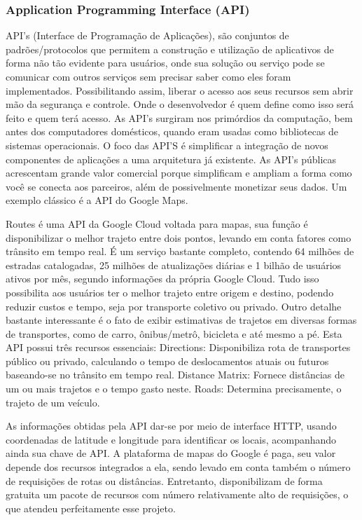 \subsubsection{Application Programming Interface (API)}
API’s (Interface de Programação de Aplicações), são conjuntos de padrões/protocolos que permitem a construção e utilização de aplicativos de forma não tão evidente para usuários, onde sua solução ou serviço pode se comunicar com outros serviços sem precisar saber como eles foram implementados. Possibilitando assim, liberar o acesso aos seus recursos sem abrir mão da segurança e controle. Onde o desenvolvedor é quem define como isso será feito e quem terá acesso.
As API’s surgiram nos primórdios da computação, bem antes dos computadores domésticos, quando eram usadas como bibliotecas de sistemas operacionais.
O foco das API'S é simplificar a integração de novos componentes de aplicações a uma arquitetura já existente.
As API’s públicas acrescentam grande valor comercial porque simplificam e ampliam a forma como você se conecta aos parceiros, além de possivelmente monetizar seus dados. Um exemplo clássico é a API do Google Maps.
\cite{apiredhat}

Routes é uma API da Google Cloud voltada para mapas, sua função é disponibilizar o melhor trajeto entre dois pontos, levando em conta fatores como trânsito em tempo real.
É um serviço bastante completo, contendo 64 milhões de estradas catalogadas, 25 milhões de atualizações diárias e 1 bilhão de usuários ativos por mês, segundo informações da própria Google Cloud.
Tudo isso possibilita aos usuários ter o melhor trajeto entre origem e destino, podendo reduzir custos e tempo, seja por transporte coletivo ou privado.
Outro detalhe bastante interessante é o fato de exibir estimativas de trajetos em diversas formas de transportes, como de carro, ônibus/metrô, bicicleta e até mesmo a pé. 
Esta API possui três recursos essenciais:
Directions: Disponibiliza rota de transportes público ou privado, calculando o tempo de deslocamentos atuais ou futuros baseando-se no trânsito em tempo real.
Distance Matrix: Fornece distâncias de um ou mais trajetos e o tempo gasto neste.
Roads: Determina precisamente, o trajeto de um veículo.

As informações obtidas pela API dar-se por meio de interface HTTP, usando coordenadas de latitude e longitude para identificar os locais, acompanhando ainda sua chave de API. A plataforma de mapas do Google é paga, seu valor depende dos recursos integrados a ela, sendo levado em conta também o número de requisições de rotas ou distâncias. Entretanto, disponibilizam de forma gratuita um pacote de recursos com número relativamente alto de requisições, o que atendeu perfeitamente esse projeto.
\cite{routes}


